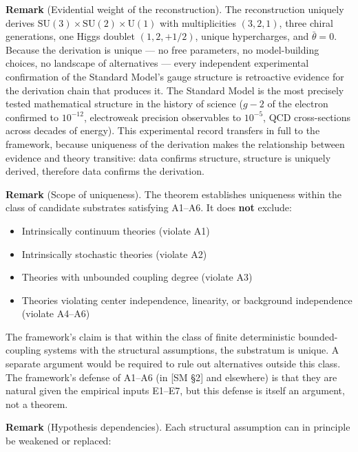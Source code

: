 \documentclass[
]{article}
\providecommand{\tightlist}{%
  \setlength{\itemsep}{0pt}\setlength{\parskip}{0pt}}
\begin{document}
\textbf{Remark} (Evidential weight of the reconstruction). The
reconstruction uniquely derives
\(\text{SU}(3) \times \text{SU}(2) \times \text{U}(1)\) with
multiplicities \((3, 2, 1)\), three chiral generations, one Higgs
doublet \((1, 2, +1/2)\), unique hypercharges, and \(\bar\theta = 0\).
Because the derivation is unique --- no free parameters, no
model-building choices, no landscape of alternatives --- every
independent experimental confirmation of the Standard Model's gauge
structure is retroactive evidence for the derivation chain that produces
it. The Standard Model is the most precisely tested mathematical
structure in the history of science (\(g - 2\) of the electron confirmed
to \(10^{-12}\), electroweak precision observables to \(10^{-5}\), QCD
cross-sections across decades of energy). This experimental record
transfers in full to the framework, because uniqueness of the derivation
makes the relationship between evidence and theory transitive: data
confirms structure, structure is uniquely derived, therefore data
confirms the derivation.

\textbf{Remark} (Scope of uniqueness). The theorem establishes
uniqueness within the class of candidate substrates satisfying A1--A6.
It does \textbf{not} exclude:

\begin{itemize}
\tightlist
\item
  Intrinsically continuum theories (violate A1)
\item
  Intrinsically stochastic theories (violate A2)
\item
  Theories with unbounded coupling degree (violate A3)
\item
  Theories violating center independence, linearity, or background
  independence (violate A4--A6)
\end{itemize}

The framework's claim is that within the class of finite deterministic
bounded-coupling systems with the structural assumptions, the substratum
is unique. A separate argument would be required to rule out
alternatives outside this class. The framework's defense of A1--A6 (in
{[}SM §2{]} and elsewhere) is that they are natural given the empirical
inputs E1--E7, but this defense is itself an argument, not a theorem.

\textbf{Remark} (Hypothesis dependencies). Each structural assumption
can in principle be weakened or replaced:
\end{document}
